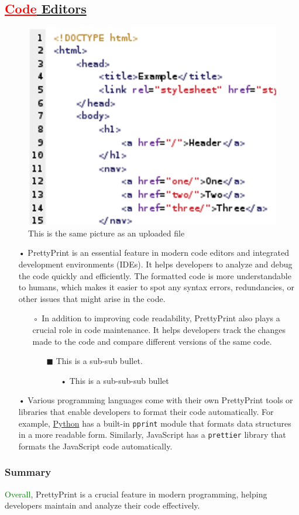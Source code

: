 \documentclass[12pt, a4paper]{article}
\makeatletter
\def\maxwidth#1{\ifdim\Gin@nat@width>#1 #1\else\Gin@nat@width\fi}
\makeatother
\begin{document}
\subsection{\textcolor{red}{\underline{Code}}\underline{ Editors}}
\begin{figure}[h]
\includegraphics[width=\maxwidth{\linewidth}]{PrettyPrint.png}
\centering
\caption{This is the same picture as an uploaded file}
\end{figure}
\begin{itemize}
\item[•] PrettyPrint is an essential feature in modern code editors and integrated development environments (IDEs).
 It helps developers to analyze and debug the code quickly and efficiently.
 The formatted code is more understandable to humans, which makes it easier to spot any syntax errors, redundancies, or other issues that might arise in the code.
\begin{itemize}
\item[◦] In addition to improving code readability, PrettyPrint also plays a crucial role in code maintenance.
 It helps developers track the changes made to the code and compare different versions of the same code.
\begin{itemize}
\item[$\blacksquare$] This is a sub-sub bullet.
\begin{itemize}
\item[•] This is a sub-sub-sub bullet
\end{itemize}
\end{itemize}
\end{itemize}
\item[•] Various programming languages come with their own PrettyPrint tools or libraries that enable developers to format their code automatically.
 For example, \href{http://python.org/}{Python} has a built-in \texttt{pprint} module that formats data structures in a more readable form.
 Similarly, JavaScript has a \texttt{prettier} library that formats the JavaScript code automatically.
\end{itemize}
\subsubsection{Summary}
\textcolor{green}{Overall}, PrettyPrint is a crucial feature in modern programming, helping developers maintain and analyze their code effectively.
\end{document}
